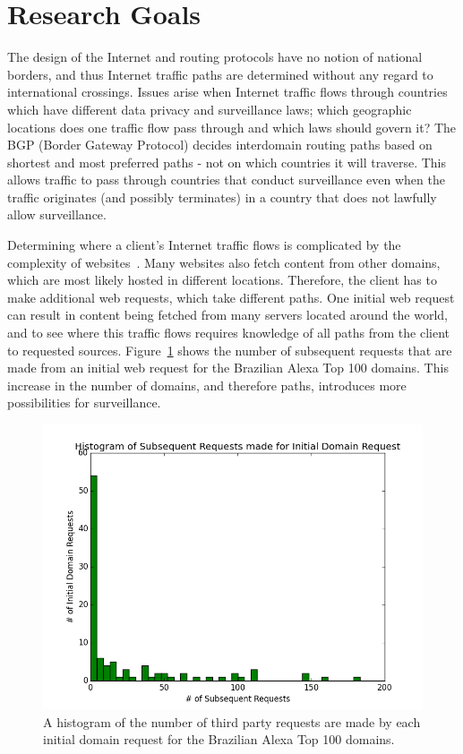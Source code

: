\section{Research Goals}
\label{problem}

The design of the Internet and routing protocols have no notion of national borders, and thus Internet traffic paths are determined without any regard to international crossings.  Issues arise when Internet traffic flows through countries which have different data privacy and surveillance laws; which geographic locations does one traffic flow pass through and which laws should govern it?  The BGP (Border Gateway Protocol) decides interdomain routing paths based on shortest and most preferred paths - not on which countries it will traverse.  This allows traffic to pass through countries that conduct surveillance even when the traffic originates (and possibly terminates) in a country that does not lawfully allow surveillance.  

Determining where a client's Internet traffic flows is complicated by the complexity of websites~\cite{butkiewicz2011understanding}.  Many websites also fetch content from other domains, which are most likely hosted in different locations.  Therefore, the client has to make additional web requests, which take different paths.  One initial web request can result in content being fetched from many servers located around the world, and to see where this traffic flows requires knowledge of all paths from the client to requested sources.  Figure~\ref{fig:domains} shows the number of subsequent requests that are made from an initial web request for the Brazilian Alexa Top 100 domains.  This increase in the number of domains, and therefore paths, introduces more possibilities for surveillance.

\begin{figure}
\centering
\includegraphics[width=.5\textwidth]{subsequent_request_hist}
\caption{A histogram of the number of third party requests are made by each initial domain request for the Brazilian Alexa Top 100 domains.}
\label{fig:domains}
\end{figure}

